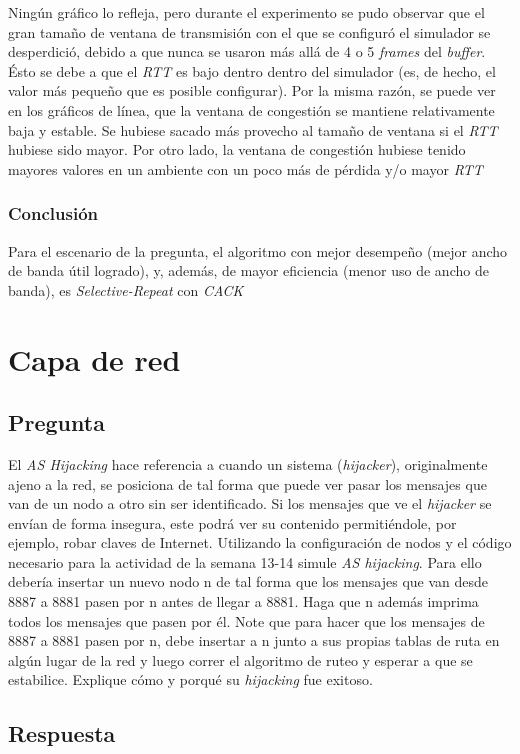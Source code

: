 \documentclass{article}
\begin{document}
Ningún gráfico lo refleja, pero durante el experimento se pudo observar que el gran tamaño de ventana de transmisión con el que se configuró el simulador se desperdició, debido a que nunca se usaron más allá de 4 o 5 \textit{frames} del \textit{buffer}. Ésto se debe a que el \textit{RTT} es bajo dentro dentro del simulador (es, de hecho, el valor más pequeño que es posible configurar). Por la misma razón, se puede ver en los gráficos de línea, que la ventana de congestión se mantiene relativamente baja y estable. Se hubiese sacado más provecho al tamaño de ventana si el \textit{RTT} hubiese sido mayor. Por otro lado, la ventana de congestión hubiese tenido mayores valores en un ambiente con un poco más de pérdida y/o mayor \textit{RTT}
\subsubsection{Conclusión}
Para el escenario de la pregunta, el algoritmo con mejor desempeño (mejor ancho de banda útil logrado), y, además, de mayor eficiencia (menor uso de ancho de banda), es \textit{Selective-Repeat} con \textit{CACK}
\section{Capa de red}
\subsection{Pregunta}
El \textit{AS Hijacking} hace referencia a cuando un sistema (\textit{hijacker}), originalmente ajeno a la red, se posiciona de tal forma que puede ver pasar los mensajes que van de un nodo a otro sin ser identificado. Si los mensajes que ve el \textit{hijacker} se envían de forma insegura, este podrá ver su contenido permitiéndole, por ejemplo, robar claves de Internet. Utilizando la configuración de nodos y el código necesario para la actividad de la semana 13-14 simule \textit{AS hijacking}. Para ello debería insertar un nuevo nodo n de tal forma que los mensajes que van desde 8887 a 8881 pasen por n antes de llegar a 8881. Haga que n además imprima todos los mensajes que pasen por él. Note que para hacer que los mensajes de 8887 a 8881 pasen por n, debe insertar a n junto a sus propias tablas de ruta en algún lugar de la red y luego correr el algoritmo de ruteo y esperar a que se estabilice. Explique cómo y porqué su \textit{hijacking} fue exitoso.
\subsection{Respuesta}
\end{document}
